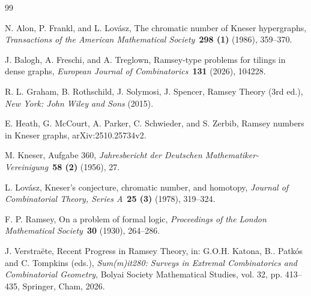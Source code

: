 \documentclass[11pt]{amsart}
\begin{document}
\begin{thebibliography}{99}

 N. Alon, P. Frankl, and L. Lov\'asz, The chromatic number of Kneser hypergraphs, \emph{Transactions of the American Mathematical Society}~{\bf 298 (1)} (1986), 359--370.

 J. Balogh, A. Freschi, and A. Treglown, Ramsey-type problems for tilings in dense graphs, \emph{European Journal of Combinatorics}~{\bf 131} (2026), 104228.

 R. L. Graham, B. Rothschild, J. Solymosi, J. Spencer, Ramsey Theory (3rd ed.), \emph{New York: John Wiley and Sons} (2015).

 E. Heath, G. McCourt, A. Parker, C. Schwieder, and S. Zerbib, Ramsey numbers in Kneser graphs, arXiv:2510.25734v2. 

 M. Kneser, Aufgabe 360, \emph{Jahresbericht der Deutschen Mathematiker-Vereinigung}~{\bf 58 (2)} (1956), 27.

 L. Lov\'asz, Kneser's conjecture, chromatic number, and homotopy, \emph{Journal of Combinatorial Theory, Series A}~{\bf 25 (3)} (1978), 319--324.

 F. P. Ramsey, On a problem of formal logic, \emph{Proceedings of the London Mathematical Society}~{\bf 30} (1930), 264--286.

 J. Verstra\"ete, Recent Progress in Ramsey Theory, in: G.O.H. Katona, B.. Patk\'os and C. Tompkins (eds.), \emph{Sum(m)it280: Surveys in Extremal Combinatorics and Combinatorial Geometry}, Bolyai Society Mathematical Studies, vol. 32, pp. 413--435, Springer, Cham, 2026.

\end{thebibliography}
\end{document}
